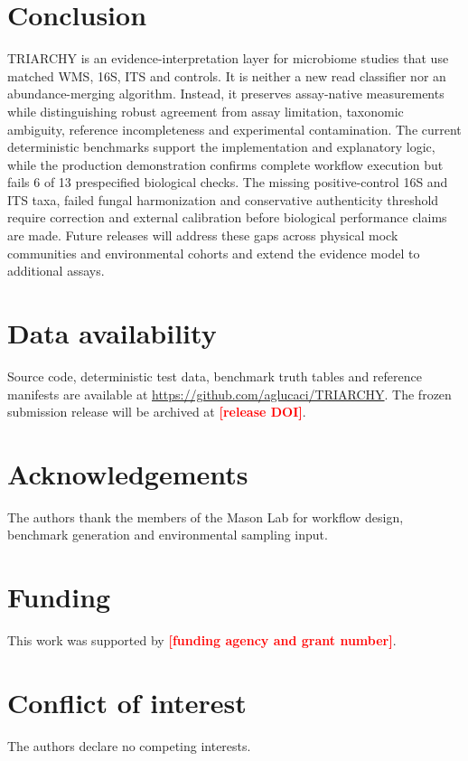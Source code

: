 \documentclass[9pt,twocolumn]{extarticle}
\newcommand{\placeholder}[1]{\textcolor{red}{\textbf{[#1]}}}
\begin{document}
\section{Conclusion}

TRIARCHY is an evidence-interpretation layer for microbiome studies that use
matched WMS, 16S, ITS and controls. It is neither a new read classifier nor an
abundance-merging algorithm. Instead, it preserves assay-native measurements
while distinguishing robust agreement from assay limitation, taxonomic
ambiguity, reference incompleteness and experimental contamination. The
current deterministic benchmarks support the implementation and explanatory
logic, while the production demonstration confirms complete workflow execution
but fails 6 of 13 prespecified biological checks. The missing positive-control
16S and ITS taxa, failed fungal harmonization and conservative authenticity
threshold require correction and external calibration before biological
performance claims are made. Future releases will address these gaps across
physical mock communities and environmental cohorts and extend the evidence
model to additional assays.

\section*{Data availability}
Source code, deterministic test data, benchmark truth tables and reference
manifests are available at \url{https://github.com/aglucaci/TRIARCHY}.
The frozen submission release will be archived at \placeholder{release DOI}.

\section*{Acknowledgements}
The authors thank the members of the Mason Lab for workflow design, benchmark
generation and environmental sampling input.

\section*{Funding}
This work was supported by \placeholder{funding agency and grant number}.

\section*{Conflict of interest}
The authors declare no competing interests.



\end{document}
